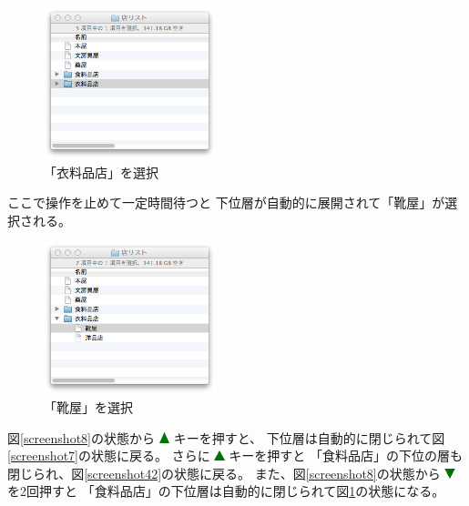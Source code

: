 \documentclass[twoside]{wiss}
\def\figwidth{50mm}
\def\up{ \includegraphics[width=3mm,bb=0 0 36 36]{figures/uptriangle.pdf} }
\def\down{ \includegraphics[width=3mm,bb=0 0 36 36]{figures/downtriangle.pdf} }
\begin{document}
\begin{figure}[H]
\centerline{\includegraphics[width=\figwidth,bb=0 0 344 304]{figures/c5c757d8f79d5a8a9c85eef25600ba66.png}}
\caption{「衣料品店」を選択}
\label{screenshot9}
\end{figure}

\noindent
ここで操作を止めて一定時間待つと
下位層が自動的に展開されて「靴屋」が選択される。

\begin{figure}[H]
\centerline{\includegraphics[width=\figwidth,bb=0 0 344 304]{figures/fddd5777d39924ea3f0220ae39a604c1.png}}
\caption{「靴屋」を選択}
\label{screenshot10}
\end{figure}

図\ref{screenshot8}の状態から{\up}キーを押すと、
下位層は自動的に閉じられて図\ref{screenshot7}の状態に戻る。 
さらに{\up}キーを押すと
「食料品店」の下位の層も閉じられ、図\ref{screenshot42}の状態に戻る。
%
また、図\ref{screenshot8}の状態から{\down}を2回押すと
「食料品店」の下位層は自動的に閉じられて図\ref{screenshot9}の状態になる。
\end{document}
